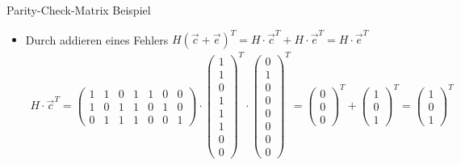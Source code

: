 \documentclass[11pt%
,aspectratio=169%
]{beamer}
\begin{document}
\begin{frame}{Parity-Check-Matrix Beispiel}
    \begin{itemize}
       \item Durch addieren eines Fehlers $H (\Vec{c} + \Vec{e})^T = H \cdot \Vec{c}^T + H \cdot \Vec{e}^T = H \cdot\Vec{e}^T$
        \begin{align*}
            H \cdot \vec{c}^T =
             \begin{pmatrix}
		            1 & 1 & 0 & 1 & 1 & 0 & 0 \\
		            1 & 0 & 1 & 1 & 0 & 1 & 0 \\
		            0 & 1 & 1 & 1 & 0 & 0 & 1 
		    \end{pmatrix} \cdot
		    \begin{pmatrix}
                1\\1\\0\\1\\1\\1\\0\\0 
		    \end{pmatrix}^T\cdot
		    \begin{pmatrix}
                0\\1\\0\\0\\0\\0\\0\\0 
		    \end{pmatrix}^T =
		    \begin{pmatrix}
		       0\\0\\0
		    \end{pmatrix}^T
		    +	    \begin{pmatrix}
		       1\\0\\1
		    \end{pmatrix}^T =  \begin{pmatrix}
		       1\\0\\1
		    \end{pmatrix}^T
        \end{align*}
    \end{itemize}

\end{frame}
\end{document}

